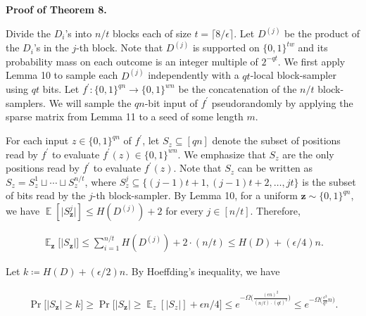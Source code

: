 \par\medskip\noindent\textbf{Proof of Theorem 8.}\par




Divide the $D_{i}$’s into $n/t$ blocks each of size $t=\lceil 8/\epsilon\rceil$.
Let $D^{(j)}$ be the product of the $D_{i}$’s in the $j$-th block.
Note that $D^{(j)}$ is supported on $\{0,1\}^{tw}$ and its probability mass on each outcome is an integer multiple of $2^{-qt}$.
We first apply Lemma 10 to sample each $D^{(j)}$ independently with a $qt$-local block-sampler using $qt$ bits.
Let $f^{\prime}\colon\{0,1\}^{qn}\to\{0,1\}^{wn}$ be the concatenation of the $n/t$ block-samplers.
We will sample the $qn$-bit input of $f^{\prime}$ pseudorandomly by applying the sparse matrix from Lemma 11 to a seed of some length $m$.\par




For each input $z\in\{0,1\}^{qn}$ of $f^{\prime}$, let $S_{z}\subseteq[qn]$ denote the subset of positions read by $f^{\prime}$ to evaluate $f^{\prime}(z)\in\{0,1\}^{wn}$.
We emphasize that $S_{z}$ are the only positions read by $f^{\prime}$ to evaluate $f^{\prime}(z)$.
Note that $S_{z}$ can be written as $S_{z}=S_{z}^{1}\sqcup\cdots\sqcup S_{z}^{n/t}$, where $S_{z}^{j}\subseteq\{(j-1)t+1,(j-1)t+2,\dots,jt\}$ is the subset of bits read by the $j$-th block-sampler.
By Lemma 10, for a uniform $\boldsymbol{z}\sim\{0,1\}^{qn}$, we have $\operatorname{\mathbb{E}}[\lvert S_{\boldsymbol{z}}^{j}\rvert]\leq H(D^{(j)})+2$ for every $j\in[n/t]$.
Therefore,\par


\[\begin{gathered}
\displaystyle\operatorname{\mathbb{E}}_{\boldsymbol{z}}\bigl[\lvert S_{\boldsymbol{z}}\rvert\bigr]\leq\sum_{i=1}^{n/t}H(D^{(j)})+2\cdot(n/t)\leq H(D)+(\epsilon/4)n.
\end{gathered}\]


Let $k\coloneq H(D)+(\epsilon/2)n$.
By Hoeffding’s inequality, we have\par


\[\begin{gathered}
\displaystyle\Pr\bigl[\lvert S_{\boldsymbol{z}}\rvert\geq k\bigr]\geq\Pr\bigl[\lvert S_{\boldsymbol{z}}\rvert\geq\operatorname{\mathbb{E}}_{z}[\lvert S_{z}\rvert]+\epsilon n/4\bigr]\leq e^{-\Omega\bigl(\frac{(\epsilon n)^{2}}{(n/t)\cdot(qt)^{2}}\bigr)}\leq e^{-\Omega\bigl(\frac{\epsilon^{3}}{q^{2}}n\bigr)}.
\end{gathered}\]


